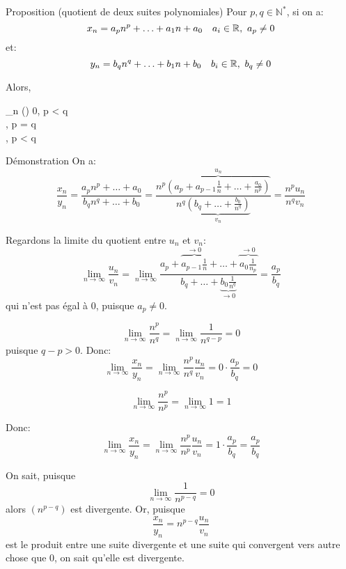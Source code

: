 \documentclass[a4paper]{article}
\begin{document}
\begin{parag}{Proposition (quotient de deux suites polynomiales)}
    Pour $p, q \in \mathbb{N}^*$, si on a:
    \[x_n = a_p n^p + \ldots + a_1 n + a_0 \quad a_i \in \mathbb{R},\ a_p \neq 0\]
    et: 
    \[y_n = b_q n^q + \ldots + b_1 n + b_0 \quad b_i \in \mathbb{R},\ b_q \neq 0\]
    
    Alors,
    \begin{functionbypart}{\lim_{n \to \infty} \left(\right)}
    0, \mathspace {} p < q \\
    , \mathspace {} p = q \\
    , \mathspace {} p < q
    \end{functionbypart}
    
    \begin{subparag}{Démonstration}
        On a: 
        \[\frac{x_n}{y_n} = \frac{a_p n^p + \ldots + a_0}{b_q n^q + \ldots + b_0} = \frac{n^p \overbrace{\left(a_p + a_{p-1} \frac{1}{n} + \ldots + \frac{a_0}{n^p}\right)}^{u_{n}}}{n^q \underbrace{\left(b_q + \ldots + \frac{b_0}{n^q}\right)}_{v_n}} = \frac{n^p u_n}{n^q v_n}\]
        
        Regardons la limite du quotient entre $u_n$ et $v_n$: 
        \[\lim_{n \to \infty} \frac{u_n}{v_n} = \lim_{n \to \infty} \frac{a_p + \overbrace{a_{p-1} \frac{1}{n} }^{\to 0}+ \ldots + \overbrace{a_0 \frac{1}{n_p}}^{\to 0}}{b_q + \ldots + \underbrace{b_0 \frac{1}{n^q}}_{\to 0}} = \frac{a_p}{b_q}\]
        qui n'est pas égal à 0, puisque $a_p \neq 0$. 

    \[\lim_{n \to \infty} \frac{n^p}{n^q} = \lim_{n \to \infty} \frac{1}{n^{q - p}} = 0\]
        puisque $q - p > 0$. Donc: 
        \[\lim_{n \to \infty} \frac{x_n}{y_n} = \lim_{n \to \infty} \frac{n^p}{n^q} \frac{u_n}{v_n} = 0\cdot \frac{a_p}{b_q} = 0\]
        
        \[\lim_{n \to \infty} \frac{n^p}{n^p} = \lim_{n \to \infty} 1 = 1 \]
        
        Donc:
        \[\lim_{n \to \infty} \frac{x_n}{y_n} = \lim_{n \to \infty} \frac{n^p}{n^p} \frac{u_n}{v_n} = 1 \cdot \frac{a_p}{b_q} = \frac{a_p}{b_q}\]
        
         On sait, puisque 
        \[\lim_{n \to \infty} \frac{1}{n^{p-q}} = 0\]
        alors $\left(n^{p - q}\right)$ est divergente. Or, puisque 
        \[\frac{x_n}{y_n} = n^{p - q} \frac{u_n}{v_n}\]
        est le produit entre une suite divergente et une suite qui convergent vers autre chose que 0, on sait qu'elle est divergente.
    \end{subparag}
    
\end{parag}
\end{document}

